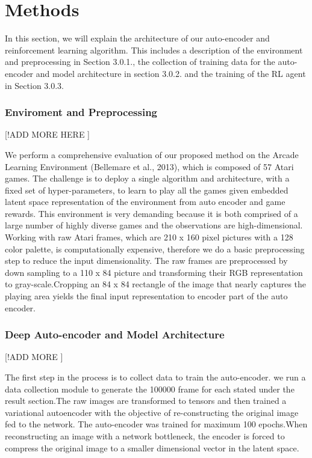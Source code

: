 \chapter{Methods }

In this section, we will explain the architecture of our auto-encoder and reinforcement learning algorithm. This includes a description of the environment and preprocessing  in Section 3.0.1., the collection of training data for the auto-encoder and model architecture in section 3.0.2. and the training of the RL agent in Section  3.0.3.


\subsection{Enviroment and Preprocessing}
[!ADD MORE HERE ]

We perform a comprehensive evaluation of our proposed method on the Arcade Learning Environment (Bellemare et al., 2013), which is composed of 57 Atari games. The challenge is to deploy a single algorithm and architecture, with a fixed set of hyper-parameters, to learn to play all the games given embedded latent space representation of the environment from auto encoder and game rewards. This environment is very demanding because it is both comprised of a large number of highly diverse games and the observations are high-dimensional.\\

Working with raw Atari frames, which are 210 x 160 pixel pictures with a 128 color palette, is computationally expensive, therefore we do a basic preprocessing step to reduce the input dimensionality. The raw frames are preprocessed by down sampling to a 110 x 84 picture and transforming their RGB representation to gray-scale.Cropping an 84 x 84 rectangle of the image that nearly captures the playing area yields the final input representation to encoder part of the auto encoder.


\subsection{Deep Auto-encoder and Model Architecture}
[!ADD MORE ]

The first step in the process is to collect data to train the auto-encoder. we run a data collection module to generate the 100000 frame for each stated under the result section.The raw images are transformed to tensors and then trained a variational autoencoder with the objective of re-constructing the original image fed to the network. The auto-encoder was trained for maximum  100 epochs.When reconstructing an image with a network bottleneck, the encoder is forced to compress the original image to a smaller dimensional vector in the latent space.

